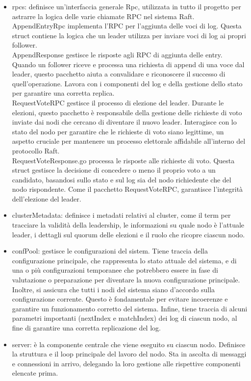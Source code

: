 \begin{itemize}
  \item rpcs: definisce un'interfaccia generale Rpc, utilizzata in tutto il progetto per astrarre la logica delle varie chiamate RPC nel sistema Raft. \\AppendEntryRpc implementa l'RPC per l'aggiunta delle voci di log. Questa 
    struct 
    contiene la logica che un leader utilizza per inviare voci di log ai propri follower.\\AppendResponse gestisce le risposte agli RPC di aggiunta delle entry. Quando un follower riceve e processa una richiesta di append di una
    voce dal leader, questo pacchetto aiuta a convalidare e riconoscere il successo di quell'operazione. Lavora con i componenti del log e della gestione dello stato per garantire una corretta replica. \\RequestVoteRPC gestisce il
    processo di elezione del leader. Durante le elezioni, questo pacchetto è responsabile della gestione delle richieste di voto inviate dai nodi che cercano di diventare il nuovo leader. Interagisce con lo stato del nodo per 
    garantire che le richieste di voto siano legittime, un aspetto cruciale per mantenere un processo elettorale affidabile all'interno del protocollo Raft. \\RequestVoteResponse.go processa le risposte alle richieste di voto. 
    Questa struct gestisce la decisione di concedere o meno il proprio voto a un candidato, basandosi sullo stato e sul log sia del nodo richiedente che del nodo rispondente. Come il pacchetto RequestVoteRPC, garantisce l'integrità
    dell'elezione del leader. 

  \item clusterMetadata: definisce i metadati relativi al cluster, come il term per tracciare la validità della leadership, le informazioni su quale nodo è l'attuale leader, i dettagli sul quorum delle elezioni e il ruolo che 
    ricopre ciascun nodo.

  \item confPool: gestisce le configurazioni del sistem. Tiene traccia della configurazione principale, che rappresenta lo stato attuale del sistema, e di una o più configurazioni temporanee che potrebbero essere in fase di 
    valutazione o preparazione per diventare la nuova configurazione principale. Inoltre, si assicura che tutti i nodi del sistema siano d'accordo sulla configurazione corrente. Questo è fondamentale per evitare 
    incoerenze e garantire un funzionamento corretto del sistema. Infine, tiene traccia di alcuni parametri importanti (nextIndex e matchIndex) dei log di ciascun nodo, al fine di garantire una corretta replicazione del log. 
  
  \item server: è la componente centrale che viene eseguito su ciascun nodo. Definisce la struttura e il loop principale del lavoro del nodo. Sta in ascolta di messaggi e connessioni in arrivo, delegando la loro gestione alle 
    rispettive componenti elencate prima.

\end{itemize}



